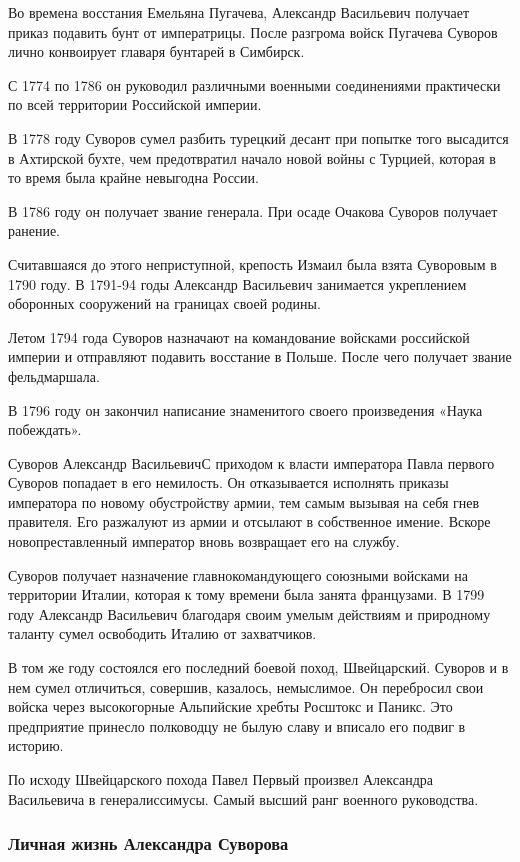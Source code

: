 Во времена восстания Емельяна Пугачева, Александр Васильевич получает приказ
подавить бунт от императрицы. После разгрома войск Пугачева Суворов лично
конвоирует главаря бунтарей в Симбирск.

С 1774 по 1786 он руководил различными военными соединениями практически по всей территории Российской империи.

В 1778 году Суворов сумел разбить турецкий десант при попытке того высадится в
Ахтирской бухте, чем предотвратил начало новой войны с Турцией, которая в то
время была крайне невыгодна России.

В 1786 году он получает звание генерала. При осаде Очакова Суворов получает ранение.

Считавшаяся до этого неприступной, крепость Измаил была взята Суворовым в 1790
году. В 1791-94 годы Александр Васильевич занимается укреплением оборонных
сооружений на границах своей родины.

Летом 1794 года Суворов назначают на командование войсками российской империи и
отправляют подавить восстание в Польше. После чего получает звание
фельдмаршала.

В 1796 году он закончил написание знаменитого своего произведения «Наука побеждать».

Суворов Александр ВасильевичС приходом к власти императора Павла первого
Суворов попадает в его немилость. Он отказывается исполнять приказы императора
по новому обустройству армии, тем самым вызывая на себя гнев правителя. Его
разжалуют из армии и отсылают в собственное имение. Вскоре новопреставленный
император вновь возвращает его на службу.

Суворов получает назначение главнокомандующего союзными войсками на территории
Италии, которая к тому времени была занята французами. В 1799 году Александр
Васильевич благодаря своим умелым действиям и природному таланту сумел
освободить Италию от захватчиков.

В том же году состоялся его последний боевой поход, Швейцарский. Суворов и в
нем сумел отличиться, совершив, казалось, немыслимое. Он перебросил свои войска
через высокогорные Альпийские хребты Росштокс и Паникс. Это предприятие
принесло полководцу не былую славу и вписало его подвиг в историю.

По исходу Швейцарского похода Павел Первый произвел Александра Васильевича в
генералиссимусы. Самый высший ранг военного руководства.

\subsubsection{Личная жизнь Александра Суворова}

